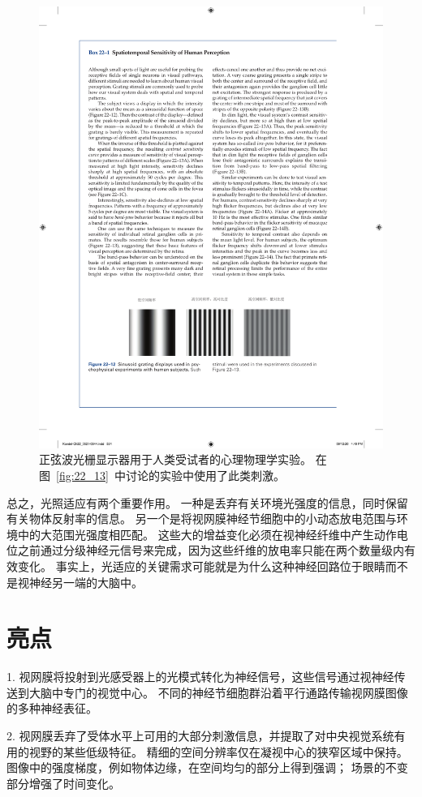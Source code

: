 \begin{figure}[htbp]
	\centering
	\includegraphics[width=0.8\linewidth]{chap22/fig_22_12}
	\caption{正弦波光栅显示器用于人类受试者的心理物理学实验。
		在图~\ref{fig:22_13}~中讨论的实验中使用了此类刺激。}
	\label{fig:22_12}
\end{figure}


总之，光照适应有两个重要作用。
一种是丢弃有关环境光强度的信息，同时保留有关物体反射率的信息。
另一个是将视网膜神经节细胞中的小动态放电范围与环境中的大范围光强度相匹配。
这些大的增益变化必须在视神经纤维中产生动作电位之前通过分级神经元信号来完成，因为这些纤维的放电率只能在两个数量级内有效变化。
事实上，光适应的关键需求可能就是为什么这种神经回路位于眼睛而不是视神经另一端的大脑中。



\section{亮点}

1. 视网膜将投射到光感受器上的光模式转化为神经信号，这些信号通过视神经传送到大脑中专门的视觉中心。 
不同的神经节细胞群沿着平行通路传输视网膜图像的多种神经表征。


2. 视网膜丢弃了受体水平上可用的大部分刺激信息，并提取了对中央视觉系统有用的视野的某些低级特征。
精细的空间分辨率仅在凝视中心的狭窄区域中保持。
图像中的强度梯度，例如物体边缘，在空间均匀的部分上得到强调；
场景的不变部分增强了时间变化。


